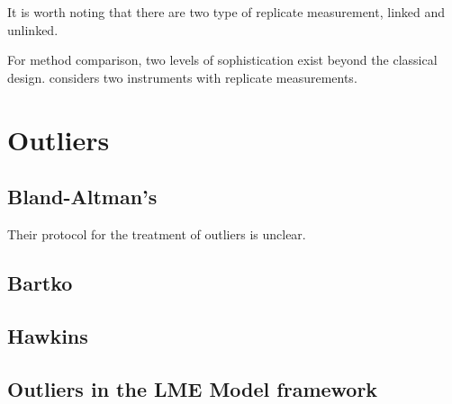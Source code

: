 \documentclass[12pt, a4paper]{report}
\theoremstyle{plain}
\theoremstyle{definition}
\theoremstyle{remark}
\begin{document}
It is worth noting that there are two type of replicate measurement, linked and unlinked.

For method comparison, two levels of sophistication exist beyond the classical design. \citet{ARoy2009} considers two instruments with replicate measurements.



\section{Outliers}

\subsection{Bland-Altman's}
Their protocol for the treatment of outliers is unclear.
\subsection{Bartko}

\subsection{Hawkins}

\subsection{Outliers in the LME Model framework}






\end{document}
